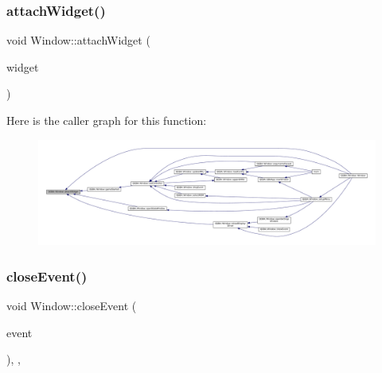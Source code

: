 \subsubsection{\texorpdfstring{attach\+Widget()}{attachWidget()}}
{\footnotesize\ttfamily void Window\+::attach\+Widget (\begin{DoxyParamCaption}\item[{Q\+Widget $\ast$}]{widget }\end{DoxyParamCaption})\hspace{0.3cm}{\ttfamily [private]}}

Here is the caller graph for this function\+:
\nopagebreak
\begin{figure}[H]
\begin{center}
\leavevmode
\includegraphics[width=350pt]{class_q_g_b_a_1_1_window_ab2307df8cc2d23a22d78d2e3fbc71fde_icgraph}
\end{center}
\end{figure}
\mbox{\label{class_q_g_b_a_1_1_window_a8ee7661af04e726c88f9628fe5de8236}} 
\subsubsection{\texorpdfstring{close\+Event()}{closeEvent()}}
{\footnotesize\ttfamily void Window\+::close\+Event (\begin{DoxyParamCaption}\item[{Q\+Close\+Event $\ast$}]{event }\end{DoxyParamCaption})\hspace{0.3cm}{\ttfamily [override]}, {\ttfamily [protected]}, {\ttfamily [virtual]}}

